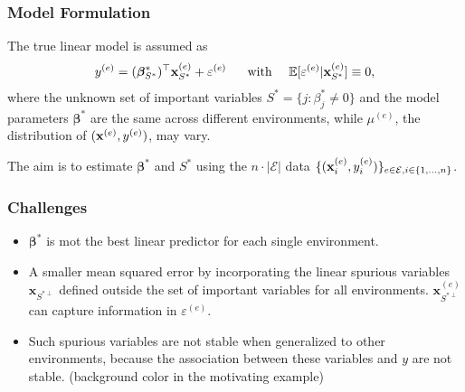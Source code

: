 \begin{frame}
  \frametitle{Model Formulation}
  The true linear model is assumed as
  \begin{align}
    \label{main_eq}
    y^{(e)} = (\bm\beta^*_{S^*})^\top \mathbf x_{S^*}^{(e)} + \varepsilon^{(e)} ~~~~~ \text{with} ~~~~ \mathbb{E}[\varepsilon^{(e)}|\mathbf x_{S^*}^{(e)}] \equiv 0,
  \end{align} where the unknown set of important variables $S^* = \{j: \beta_j^* \neq 0\}$ and the model parameters $\bm \beta^*$ are the same across different environments, while $\mu^{(e)}$, the distribution of $(\mathbf x^{(e)},y^{(e)})$, may vary.
  
  \vspace{8pt}

  The aim is to estimate $\bm\beta^*$ and $S^*$ using the $n\cdot |\mathcal{E}|$ data $\{(\mathbf x_i^{(e)}, y_i^{(e)})\}_{e\in \mathcal{E}, i\in \{1,\ldots, n\}}$.
\end{frame}

\begin{frame}
  \frametitle{Challenges}
  \begin{itemize}
  \item $\bm \beta^*$ is mot the best linear predictor for each single environment.
  \item A smaller mean squared error by incorporating the linear spurious variables $\bm x_{S^{*\perp}}$ defined outside the set of important variables for all environments.
    $\bm x_{S^{*\perp}}^{(e)}$ can capture information in $\varepsilon^{(e)}$.
  \item Such spurious variables are not stable when generalized to other environments, because the association between these variables and $y$ are not stable. (background color in the motivating example)
  \end{itemize}
\end{frame}

